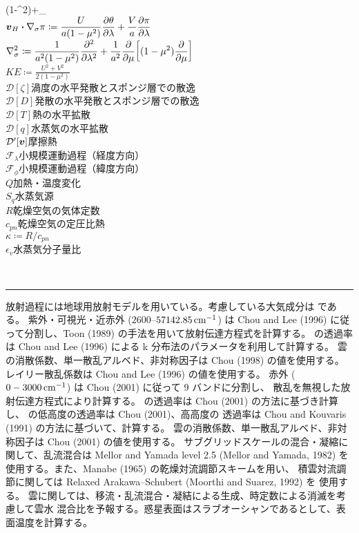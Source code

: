 \documentclass[body]{subfiles}
\begin{document}
\begin{table}[t]
\begin{minipage}{\textwidth}
\begin{minipage}{.5\textwidth}
\begin{tabbing}
					(1-\mu^2)\pdv{\pi}{\mu}+_\phi\cos\phi\)\\
				\(\displaystyle\vb*{v}_H\vdot\nabla_\sigma\pi\coloneqq
					\frac{U}{a(1-\mu^2)}\pdv{\theta}{\lambda}+\frac{V}{a}\pdv{\pi}{\lambda}\)\\
				\(\displaystyle\nabla_\sigma^2\coloneqq\frac{1}{a^2(1-\mu^2)}\pdv[2]{}{\lambda}
					+\frac{1}{a^2}\pdv{}{\mu}\qty[(1-\mu^2)\pdv{}{\mu}]\)\\
				\(\displaystyle KE\coloneqq\frac{U^2+V^2}{2(1-\mu^2)}\)\\
				\(\mathcal{D}[\zeta]\)\>渦度の水平発散とスポンジ層での散逸\\
				\(\mathcal{D}[D]\)\>発散の水平発散とスポンジ層での散逸\\
				\(\mathcal{D}[T]\)\>熱の水平拡散\\
				\(\mathcal{D}[q]\)\>水蒸気の水平拡散\\
				\(\mathcal{D}'[\vb*{v}]\)\>摩擦熱\\
				\(\mathcal{F}_\lambda\)\>小規模運動過程（経度方向）\\
				\(\mathcal{F}_\phi\)\>小規模運動過程（緯度方向）\\
				\(Q\)\>加熱・温度変化\\
				\(S_q\)\>水蒸気源\\
				\(R\)\>乾燥空気の気体定数\\
				\(c_{pn}\)\>乾燥空気の定圧比熱\\
				\(\kappa\coloneqq R/c_{pn}\)\\
				\(\epsilon_v\)\>水蒸気分子量比
			\end{tabbing}
		\end{minipage}\\
		\rule[0pt]{\textwidth}{\heavyrulewidth}
	\end{minipage}
\end{table}

放射過程には地球用放射モデルを用いている。考慮している大気成分は  である。
紫外・可視光・近赤外 (\(2600\)--\(57142.85\hmu{cm^{-1}}\))
は Chou and Lee (1996) に従って分割し、Toon \etal (1989) の手法を用いて放射伝達方程式を計算する。
 の透過率は Chou and Lee (1996) による k 分布法のパラメータを利用して計算する。
雲の消散係数、単一散乱アルベド、非対称因子は Chou \etal (1998) の値を使用する。
レイリー散乱係数は Chou and Lee (1996) の値を使用する。
赤外 (\(0-3000\hmu{cm^{-1}}\)) は Chou \etal (2001) に従って 9 バンドに分割し、
散乱を無視した放射伝達方程式により計算する。 の透過率は Chou \etal (2001)
の方法に基づき計算し、 の低高度の透過率は Chou \etal (2001)、高高度の
透過率は Chou and Kouvaris (1991) の方法に基づいて、計算する。
雲の消散係数、単一散乱アルベド、非対称因子は Chou \etal (2001) の値を使用する。
サブグリッドスケールの混合・凝縮に関して、乱流混合は Mellor and Yamada level 2.5
(Mellor and Yamada, 1982) を使用する。また、Manabe \etal (1965) の乾燥対流調節スキームを用い、
積雲対流調節に関しては Relaxed Arakawa--Schubert (Moorthi and Suarez, 1992) を
使用する。
雲に関しては、移流・乱流混合・凝結による生成、時定数による消滅を考慮して雲水
混合比を予報する。惑星表面はスラブオーシャンであるとして、表面温度を計算する。
\end{document}

